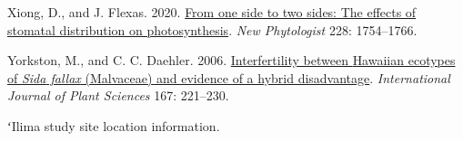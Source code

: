 \documentclass[
  letterpaper,
  DIV=11,
  numbers=noendperiod]{scrartcl}
\newlength{\cslhangindent}
\newlength{\cslentryspacingunit} %
\newenvironment{CSLReferences}[2] %
 {%
  \setlength{\parindent}{0pt}
  \ifodd #1
  \let\oldpar\par
  \def\par{\hangindent=\cslhangindent\oldpar}
  \fi
  \setlength{\parskip}{#2\cslentryspacingunit}
 }%
 {}
\begin{document}
\begin{CSLReferences}{1}{0}
\leavevmode{}%
Xiong, D., and J. Flexas. 2020.
\href{https://doi.org/10.1111/nph.16801}{From one side to two sides: The
effects of stomatal distribution on photosynthesis}. \emph{New
Phytologist} 228: 1754--1766.

\leavevmode{}%
Yorkston, M., and C. C. Daehler. 2006.
\href{https://doi.org/10.1086/499615}{Interfertility between {Hawaiian}
ecotypes of \emph{{Sida} fallax} ({Malvaceae}) and evidence of a hybrid
disadvantage}. \emph{International Journal of Plant Sciences} 167:
221--230.

\end{CSLReferences}

\clearpage

\hypertarget{tbl-locations}{}
\begin{table}
\caption{\label{tbl-locations}ʻIlima study site location information. }\tabularnewline


\end{table}
\end{document}
